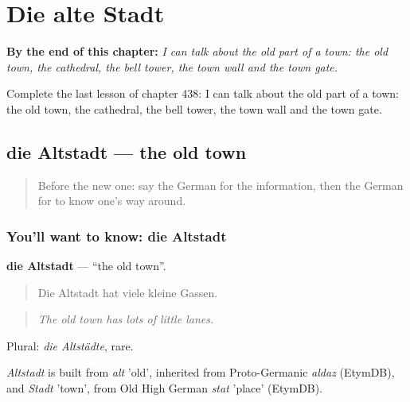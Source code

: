 
\chapter{Die alte Stadt}
\label{ch:ge-die-alte-stadt}

\begin{chapteropening}
\textbf{By the end of this chapter:} \emph{I can talk about the old part of a town: the old town, the cathedral, the bell tower, the town wall and the town gate.}

Complete the last lesson of chapter 438: I can talk about the old part of a town: the old town, the cathedral, the bell tower, the town wall and the town gate.
\end{chapteropening}

\section[die Altstadt]{die Altstadt — the old town}

\label{lesson:GE-C438-altstadt}



\begin{quote}
Before the new one: say the German for the information, then the German for to know one's way around.
\end{quote}

\subsection*{You'll want to know: die Altstadt}
\textbf{die Altstadt} — \textquotedblleft{}the old town\textquotedblright{}.

\begin{quote}
Die Altstadt hat viele kleine Gassen.
\end{quote}

\begin{quote}
\emph{The old town has lots of little lanes.}
\end{quote}

Plural: \emph{die Altstädte}, rare.

\begin{cousinweb}
\emph{Altstadt} is built from \emph{alt} 'old', inherited from Proto-Germanic \emph{aldaz} (EtymDB), and \emph{Stadt} 'town', from Old High German \emph{stat} 'place' (EtymDB).
\end{cousinweb}

